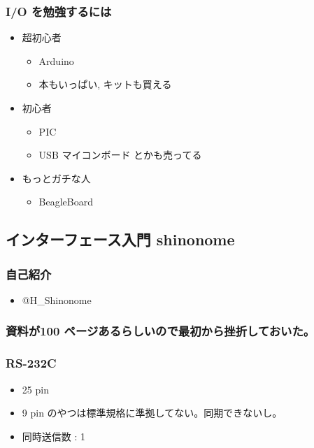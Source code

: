 \documentclass{jsarticle}
\begin{document}
\subsubsection{I/O を勉強するには}

\begin{itemize}
\item
  超初心者
  \begin{itemize}
  \item
    Arduino
  \item
    本もいっぱい, キットも買える
  \end{itemize}
\item
  初心者
  \begin{itemize}
  \item
    PIC
  \item
    USB マイコンボード とかも売ってる
  \end{itemize}
\item
  もっとガチな人
  \begin{itemize}
  \item
    BeagleBoard
  \end{itemize}
\end{itemize}
\subsection{インターフェース入門 shinonome}

\subsubsection{自己紹介}

\begin{itemize}
\item
  @H\_Shinonome
\end{itemize}
\subsubsection{資料が100 ページあるらしいので最初から挫折しておいた。}

\subsubsection{RS-232C}

\begin{itemize}
\item
  25 pin
\item
  9 pin のやつは標準規格に準拠してない。同期できないし。
\item
  同時送信数 : 1
\end{itemize}
\end{document}
